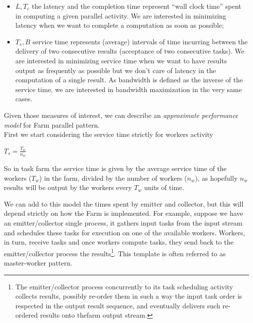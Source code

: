 	\begin{itemize}
		\item	\(L, T_c\) the latency and the completion time represent “wall clock time” spent in computing a given parallel activity. We are interested in minimizing latency when we want to complete a computation as soon as possible;
		\item \(T_s, B\) service time represents (average) intervals of time incurring between the delivery of two consecutive results (acceptance of two consecutive tasks). We are interested in minimizing service time when we want to have results output as frequently as possible but we don't care of latency in the computation of a single result. As bandwidth is
		defined as the inverse of the service time, we are interested in bandwidth maximization	in the very same cases.
	\end{itemize}

	Given those measures of interest, we can describe an \textit{approximate performance model} for Farm parallel pattern.\\
	First we start considering the service time strictly for workers activity
	\begin{center}
		\(T_s = \frac{T_w}{n_w}\)
	\end{center}
	So in task farm the service time is given by the average service time of the workers (\(T_w\)) in the farm, divided by the number of workers (\(n_w\)), as hopefully \(n_w\) results will be output by the workers every \(T_w\) units of time.
	
	We can add to this model the times spent by emitter and collector, but this will depend strictly on how the Farm is implemented. For example, suppose we have an emitter/collector single process, it gathers input tasks from the input stream and schedules these tasks for execution on one of the available workers. Workers, in turn, receive tasks and once workers compute tasks, they send back to the emitter/collector process the results\footnote{The emitter/collector process \textendash concurrently to its task scheduling	activity \textendash collects results, possibly re-order them in such a way the input task order is respected in the output result sequence, and eventually delivers such re-ordered results onto thefarm output stream.}.
	This template is often referred to as master-worker pattern.\\

